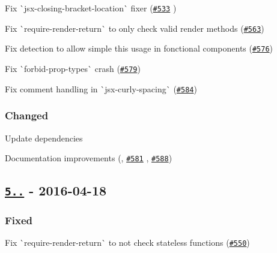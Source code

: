 \begin{DoxyItemize}
\item Fix \`{}jsx-\/closing-\/bracket-\/location\`{} fixer (\href{https://github.com/yannickcr/eslint-plugin-react/issues/533}{\tt \#533} )
\item Fix \`{}require-\/render-\/return\`{} to only check valid render methods (\href{https://github.com/yannickcr/eslint-plugin-react/issues/563}{\tt \#563})
\item Fix detection to allow simple {\ttfamily this} usage in fonctional components (\href{https://github.com/yannickcr/eslint-plugin-react/issues/576}{\tt \#576})
\item Fix \`{}forbid-\/prop-\/types\`{} crash (\href{https://github.com/yannickcr/eslint-plugin-react/issues/579}{\tt \#579})
\item Fix comment handling in \`{}jsx-\/curly-\/spacing\`{} (\href{https://github.com/yannickcr/eslint-plugin-react/pull/584}{\tt \#584})
\end{DoxyItemize}

\subsubsection*{Changed}


\begin{DoxyItemize}
\item Update dependencies
\item Documentation improvements (, \href{https://github.com/yannickcr/eslint-plugin-react/pull/581}{\tt \#581} , \href{https://github.com/yannickcr/eslint-plugin-react/issues/588}{\tt \#588})
\end{DoxyItemize}

\subsection*{\href{https://github.com/yannickcr/eslint-plugin-react/compare/v5.0.0...v5.0.1}{\tt 5..} -\/ 2016-\/04-\/18}

\subsubsection*{Fixed}


\begin{DoxyItemize}
\item Fix \`{}require-\/render-\/return\`{} to not check stateless functions (\href{https://github.com/yannickcr/eslint-plugin-react/issues/550}{\tt \#550})
\end{DoxyItemize}

